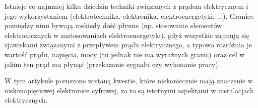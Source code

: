 % 
% 
% 
% 

Istnieje co najmniej kilka dziedzin techniki związanych z prądem elektrycznym i jego wykorzystaniem (elektrotechnika, elektronika, elektroenergetyki, ...).
Granice pomiędzy nimi bywają niekiedy dość płynne (np. stosowanie elementów elektronicznych w zastosowaniach elektroenergetyki), gdyż wszystkie zajmują się zjawiskami związanymi z przepływem prądu elektrycznego, a typowo rozróżnia je wartość prądu, napięcia, mocy (tu jednak nie ma wyraźnych granic) oraz cel w jakim ten prąd ma płynąć (przekazanie sygnału czy wykonanie pracy).

W tym artykule poruszone zostaną kwestie, które niekoniecznie mają znaczenie w niskonapięciowej elektronice cyfrowej, za to są istotnymi aspektami w instalacjach elektrycznych.
